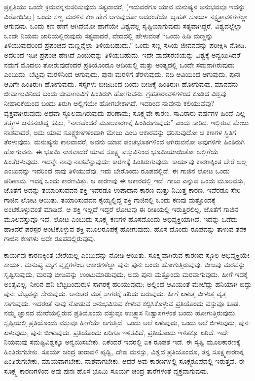 ಪ್ರಕೃತಿಯು ಒಂದೇ ಕ್ರಮವನ್ನನುಸರಿಸುವುದು ಸತ್ಯವಾದರೆ, (ಇದುವರೆಗೂ ಯಾವ ಮನುಷ್ಯನ ಅನುಭವವೂ ಇದನ್ನು ವಿರೋಧಿಸಿಲ್ಲ) ಒಂದು ಸಣ್ಣ ಮರಳಿನ ಕಣ ಹೇಗೆ ಆಗುವುದೋ ಅದರಂತೆಯೇ ಬೃಹತ್​ ಸೂರ್ಯ ನಕ್ಷತ್ರಾವಳಿಗಳೆಲ್ಲಾ ಆಗುವುವು. ಒಂದು ಕಣ ಹೇಗೆ ಆಗಿದೆಯೋ ಹಾಗೆಯೇ ವಿಶ್ವವೆಲ್ಲ ಸೃಷ್ಟಿಯಾಗುವುದು ಸತ್ಯವಾಗಿದ್ದರೆ, ವಿಶ್ವದಲ್ಲೆಲ್ಲಾ ಒಂದೇ ನಿಯಮ ಜಾರಿಯಲ್ಲಿರುವುದು ಸತ್ಯವಾದರೆ, ವೇದದಲ್ಲಿ ಹೇಳುವಂತೆ “ಒಂದು ಹಿಡಿ ಮಣ್ಣನ್ನು ತಿಳಿಯುವುದರಿಂದ ಪ್ರಪಂಚದ ಮಣ್ಣನ್ನೆಲ್ಲಾ ತಿಳಿಯಬಹುದು.” ಒಂದು ಸಣ್ಣ ಸಸಿಯ ಜೀವನವನ್ನು ಪರೀಕ್ಷಿಸಿ ನೋಡಿ. ಅದರಿಂದ ಇಡೀ ಪ್ರಪಂಚ ಹೇಗಿದೆ ಎಂಬುದನ್ನು ತಿಳಿಯಬಹುದು. ಇದೇ ವಾದಸರಣಿಯನ್ನು ವಿಶ್ವಕ್ಕೆ ಅನ್ವಯಿಸಿದರೆ ನಮಗೆ ಮೊದಲು ತೋರುವುದೆಂದರೆ ಪ್ರತಿಯೊಂದೂ ಆದಿಯಲ್ಲಿ ಮತ್ತು ಅಂತ್ಯದಲ್ಲಿ ಒಂದೇ ಸಮನಾಗಿರುವುದು ಎಂಬುದು. ಬೆಟ್ಟವು ಮರಳಿನಿಂದ ಆಗುವುದು, ಪುನಃ ಮರಳಿಗೆ ತೆರಳುವುದು. ನದಿ ಆವಿಯಿಂದ ಆಗುವುದು, ಪುನಃ ಆವಿಗೇ ಹಿಂತಿರುಗಿ ಹೋಗುವುದು. ಸಸ್ಯಗಳು ಬೀಜದಿಂದ ಬಂದು ಬೀಜಕ್ಕೆ ಹಿಂತಿರುಗಿ ಹೋಗುವುವು. ಮಾನವನು ಜೀವಾಣುವಿನಿಂದ ಬಂದು ಜೀವಾಣುವಿಗೆ ಹಿಂತಿರುಗಿ ಹೋಗುವನು. ಗ್ರಹತಾರಾವಳಿಗಳಿಂದ ಕೂಡಿದ ವಿಶ್ವವು ನೀಹಾರಿಕೆಯಿಂದ ಬಂದು ತಿರುಗಿ ಅಲ್ಲಿಗೆಯೇ ಹೋಗಬೇಕಾಗಿದೆ. ಇದರಿಂದ ನಾವೇನು ಕಲಿಯುವೆವು? ವ್ಯಕ್ತವಾಗಿರುವುದು ಅಥವಾ ಸ್ಥೂಲವಾಗಿರುವುದು ಪರಿಣಾಮ; ಸೂಕ್ಷ್ಮವೇ ಕಾರಣ. ಸಾವಿರಾರು ವರ್ಷಗಳ ಹಿಂದೆ ಎಲ್ಲ ತತ್ತ್ವಗಳ ಜನಕನಂತಿದ್ದ ಕಪಿಲ, “ನಾಶವೆಂದರೆ ಮೂಲಕಾರಣಕ್ಕೆ ಹಿಂತಿರುಗುವುದು” ಎಂದು ಸಾರಿದ. ಇಲ್ಲಿರುವ ಮೇಜು ನಾಶವಾದರೆ, ಅದು ಯಾವ ಸೂಕ್ಷ್ಮಕಣಗಳಿಂದಾಗಿ ಮೇಜು ಎಂಬ ಆಕಾರವನ್ನು ಧರಿಸುವುದೋ ಆ ಕಣಗಳ ಸ್ಥಿತಿಗೆ ತೆರಳುವುದು. ಮನುಷ್ಯನು ಕಾಲವಾದರೆ, ಅವನು ಯಾವ ಪಂಚಭೂತಗಳಿಂದ ಆಗಿರುವನೋ ಅವುಗಳಿಗೇ ಹಿಂತಿರುಗಿ ಹೋಗುವನು. ಈ ಭೂಮಿ ನಾಶವಾದರೆ ಯಾವ ಸೂಕ್ಷ್ಮ ವಸ್ತುವಿನಿಂದ ಭೂಮಿಯಾಯಿತೋ ಅಲ್ಲಿಗೆಯೆ ಹಿಂತೆರಳುವುದು. ಇದನ್ನೇ ನಾವು ನಾಶವೆನ್ನುವುದು; ಕಾರಣಕ್ಕೆ ಹಿಂತಿರುಗುವುದು. ಕಾರ್ಯವು ಕಾರಣಕ್ಕಿಂತ ಬೇರೆ ಅಲ್ಲ ಎಂಬುದನ್ನು ಇದರಿಂದ ನಾವು ತಿಳಿಯುವೆವು. ಇದು ಬೇರೊಂದು ರೂಪದಲ್ಲಿದೆ. ಈ ಗಾಜಿನ ಲೋಟ ಒಂದು ಪರಿಣಾಮ. ಇದಕ್ಕೆ ಒಂದು ಕಾರಣವಿತ್ತು. ಆ ಕಾರಣವು ಈ ಆಕಾರದಲ್ಲಿ ಇದೆ. ಗಾಜು ಎನ್ನುವ ಒಂದು ಮೂಲವಸ್ತು, ಜೊತೆಗೆ ಅದನ್ನು ತಯಾರಿಸುವವನ ಶಕ್ತಿ ಇವೆರಡೂ ಉಪಾದಾನ ಕಾರಣ ಮತ್ತು ನಿಮಿತ್ತ ಕಾರಣ. ಇವೆರಡೂ ಸೇರಿ ಗಾಜಿನ ಲೋಟ ಆಯಿತು. ತಯಾರಿಸುವವನ ಕೈಯ್ಯಲ್ಲಿದ್ದ ಶಕ್ತಿ ಗಾಜಿನಲ್ಲಿ ಒಂದು ಕಣವು ಮತ್ತೊಂದಕ್ಕೆ ಅಂಟಿಕೊಳ್ಳುವಂತೆ ಮಾಡಿದೆ. ಆ ಶಕ್ತಿ ಇಲ್ಲದೆ ಇದ್ದರೆ ಲೋಟವು ಈ ರೀತಿಯಲ್ಲಿ ಇರುತ್ತಿರಲಿಲ್ಲ. ಜೊತೆಗೆ ಗಾಜಿನ ಮೂಲವಸ್ತುವೂ ಇದೆ. ಲೋಟ ಎಂಬುದು ಸೂಕ್ಷ್ಮ ಕಣಗಳ ಹೊಸದೊಂದು ಅಭಿವ್ಯಕ್ತಿಯಾಗಿದೆ. ಇದನ್ನು ಒಡೆದು ಹಾಕಿದರೆ ಪರಸ್ಪರ ಅಂಟಿಕೊಳ್ಳುವ ಶಕ್ತಿ ಮೂಲರೂಪಕ್ಕೆ ಹೋಗುವುದು. ಹೊಸ ದೊಂದು ರೂಪವನ್ನು ತಾಳುವ ತನಕ ಗಾಜಿನ ಕಣಗಳು ಅದೇ ರೂಪದಲ್ಲಿರುವುವು.

ಕಾರ್ಯವು ಕಾರಣಕ್ಕಿಂತ ಬೇರೆಯಲ್ಲ ಎಂಬುದನ್ನು ನೋಡಿ ಆಯಿತು. ಸೂಕ್ಷ್ಮವಾಗಿರುವ ಕಾರಣದ ಸ್ಥೂಲ ಅಭಿವ್ಯಕ್ತಿಯೇ ಕಾರ್ಯ. ಮನುಷ್ಯ ಮೃಗ ವೃಕ್ಷಗಳೆಂಬ ಆಕಾರಗಳೆಲ್ಲಾ ಪುನಃ ಪುನಃ ಬಂದು ಹೋಗುತ್ತಿರುವುವು. ಬೀಜವು ಮರವನ್ನು ಸೃಷ್ಟಿಸುವುದು, ಮರವು ಬೀಜವನ್ನು ಉಂಟುಮಾಡುವುದು, ಅದು ಪುನಃ ಮತ್ತೊಂದು ಮರವಾಗುವುದು. ಹೀಗೆ ಇದಕ್ಕೆ ಅಂತ್ಯವಿಲ್ಲ. ನೀರಿನ ಹನಿ ಬೆಟ್ಟದಿಂದುರುಳಿ ಸಾಗರಕ್ಕೆ ಹರಿಯುವುದು; ಅಲ್ಲಿಂದ ಆವಿಯಂತೆ ಮೇಲೆದ್ದು ಹನಿಯಾಗಿ ಬಿದ್ದು ಪುನಃ ಬೆಟ್ಟವನ್ನು ಸೇರುವುದು. ಅನಂತರ ಮತ್ತೆ ಸಾಗರಕ್ಕೆ ಹರಿದು ಬರುವುದು. ಹೀಗೆ ಏಳುತ್ತ ಬೀಳುತ್ತ ವೃತ್ತ ಸಾಗುವುದು. ಇದರಂತೆ ನಾವು ನೋಡುವ ಅನುಭವಿಸುವ ಕೇಳುವ ಕಲ್ಪಿಸಿಕೊಳ್ಳುವ ಪ್ರತಿಯೊಂದು ವಸ್ತುವೂ ಕೂಡ. ನಮ್ಮ ಜ್ಞಾನದ ಮೇರೆಯಲ್ಲಿರುವ ಪ್ರತಿಯೊಂದು ವಸ್ತುವೂ ಉಚ್ಛ್ವಾಸ ನಿಃಶ್ವಾಸಗಳಂತೆ ಬಂದು ಹೋಗುತ್ತಿರುವುದು. ಸೃಷ್ಟಿಯಲ್ಲಿ ಪ್ರತಿಯೊಂದು ವಸ್ತುವೂ ಹೀಗೆಯೇ ಆಗುತ್ತಿದೆ. ಒಂದು ಅಲೆ ಏಳುವುದು, ಒಂದು ಅಲೆ ಬೀಳುವುದು, ಪುನಃ ಏಳುವುದು, ಪುನಃ ಬೀಳುವುದು. ಪ್ರತಿಯೊಂದು ಏರಿಗೂ ಇಳಿತವಿದೆ, ಪ್ರತಿಯೊಂದು ಇಳಿತಕ್ಕೂ ಏರಿದೆ. ಇದೇ ನಿಯಮವು ಸಮಷ್ಟಿವಿಶ್ವಕ್ಕೂ ಅನ್ವಯಿಸಬೇಕು. ಏಕೆಂದರೆ ಇದರಲ್ಲಿ ಏಕ ರೂಪತೆ ಇದೆ. ಈ ಸೃಷ್ಟಿ ಮೂಲಕಾರಣಕ್ಕೆ ಹಿಂತಿರುಗಬೇಕು. ಸೂರ್ಯ ಚಂದ್ರ ತಾರಾವಳಿ ಪೃಥ್ವಿ, ದೇಹ ಮನಸ್ಸು, ವಿಶ್ವದ ಪ್ರತಿಯೊಂದೂ, ತನ್ನ ಸೂಕ್ಷ್ಮಕಾರಣಕ್ಕೆ ಹಿಂತಿರುಗಬೇಕು, ಮಾಯವಾಗಬೇಕು, ನಾಶವಾಗಬೇಕು. ಆದರೆ ಅವು ಕಾರಣಗಳಲ್ಲಿ ಸೂಕ್ಷ್ಮರೂಪದಲ್ಲಿ ಇರುತ್ತವೆ. ಈ ಸೂಕ್ಷ್ಮ ಕಾರಣಗಳಿಂದ ಅವು ಪುನಃ ಹೊಸ ಭೂಮಿ ಸೂರ್ಯ ಚಂದ್ರ ತಾರೆಗಳಂತೆ ವ್ಯಕ್ತವಾಗುವುವು.

